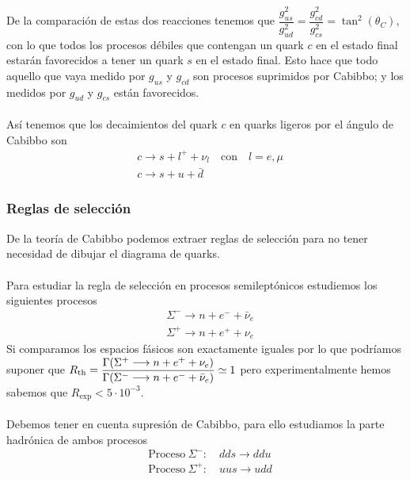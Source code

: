 \noindent De la comparación de estas dos reacciones tenemos que $\dfrac{g_{us}^2}{g_{ud}^2}=\dfrac{g_{cd}^2}{g_{cs}^2}=\tan^2(\theta_{C})$, con lo que todos los procesos débiles que contengan un quark $c$ en el estado final estarán favorecidos a tener un quark $s$ en el estado final. Esto hace que todo aquello que vaya medido por $g_{us}$ y $g_{cd}$ son procesos suprimidos por Cabibbo; y los medidos por $g_{ud}$ y $g_{cs}$ están favorecidos. \\\\
Así tenemos que los decaimientos del quark $c$ en quarks ligeros por el ángulo de Cabibbo son
\begin{equation}
    \begin{aligned}
        &c\longrightarrow s+l^++\nu_l \quad \text{con} \quad l=e,\mu\\
        & c\longrightarrow s+u+\bar{d}
    \end{aligned}
    \label{eq: Decaimientos favorecidos c}
\end{equation}

\subsubsection{Reglas de selección}
De la teoría de Cabibbo podemos extraer reglas de selección para no tener necesidad de dibujar el diagrama de quarks.\\\\
Para estudiar la regla de selección en procesos semileptónicos estudiemos los siguientes procesos
\begin{equation*}
    \begin{aligned}
        &\Sigma^- \longrightarrow n+e^-+\bar{\nu}_e \\
        &\Sigma^+ \longrightarrow n+e^++\nu_e
    \end{aligned}
\end{equation*}
Si comparamos los espacios fásicos son exactamente iguales por lo que podríamos suponer que $R_\mathrm{th}=\dfrac{\Gamma\qty(\Sigma^+ \longrightarrow n+e^++\nu_e)}{\Gamma\qty(\Sigma^- \longrightarrow n+e^-+\bar{\nu}_e)}\simeq 1$ pero experimentalmente hemos sabemos que $R_\mathrm{exp}<5\cdot 10^{-3}$. \\\\
Debemos tener en cuenta supresión de Cabibbo, para ello estudiamos la parte hadrónica de ambos procesos
\begin{equation*}
    \begin{aligned}
        &\mathrm{Proceso} \ \Sigma^- : \quad dds \longrightarrow ddu \\
        &\mathrm{Proceso} \ \Sigma^+:  \quad uus \longrightarrow udd
    \end{aligned}
\end{equation*}


